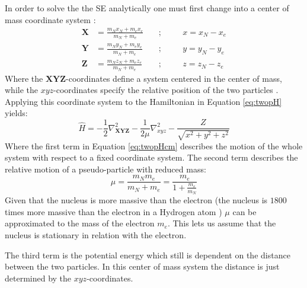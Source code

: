 \documentclass[../master_thesis.tex]{subfiles}
\begin{document}
In order to solve the the \ac{SE} analytically one must first change into a
center of mass coordinate system :
\begin{equation}
  \begin{aligned} \label{eq:cmparam}
    \mathbf{X} &= \frac{m_Nx_N + m_ex_e}{m_N + m_e} \ &&;\  &&&x= x_N - x_e \\
    \mathbf{Y} &= \frac{m_Ny_N + m_ey_e}{m_N + m_e} \ &&;\  &&&y= y_N - y_e \\
    \mathbf{Z} &= \frac{m_Nz_N + m_ez_e}{m_N + m_e} \ &&;\  &&&z= z_N - z_e
  \end{aligned}
\end{equation}
Where the $\mathbf{XYZ}$-coordinates define a system centered in the center of mass,
while the $xyz$-coordinates specify the relative position of the two particles
\cite{Jensen:2017}. Applying this coordinate system to the Hamiltonian in
Equation \ref{eq:twopH} yields:
\begin{equation}
  \hat{H} = -\frac{1}{2}\nabla^2_{\mathbf{XYZ}} -\frac{1}{2\mu}\nabla^2_{xyz} -
  \frac{Z}{\sqrt{x^2 + y^2 + z^2}}\label{eq:twopHcm}
\end{equation}
Where the first term in Equation \ref{eq:twopHcm} describes the motion of the
whole system with respect to a fixed coordinate system. The second term
describes the relative motion of a pseudo-particle with reduced mass:
\begin{equation}
  \mu = \frac{m_Nm_e}{m_N + m_e} = \frac{m_e}{1 + \frac{m_e}{m_N}}
\end{equation}
Given that the nucleus is more %
 massive than the electron (the nucleus is $1800$
times more massive than the electron in a Hydrogen atom \cite{Jensen:2017})
$\mu$ can be approximated to the mass of the electron $m_e$. This lets us
assume that the nucleus is stationary in relation with the electron.

The third term is the potential energy which still is dependent on the distance
between the two particles. In this center of mass system the distance is just
determined by the $xyz$-coordinates.
\end{document}
